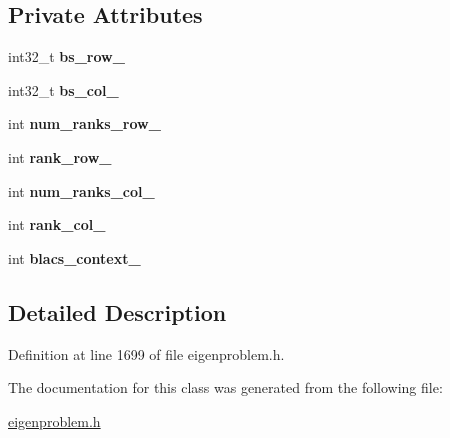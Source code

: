 \subsection*{Private Attributes}
\begin{DoxyCompactItemize}
\item 
\hypertarget{class_eigenproblem___r_s___g_p_u_a783aab3929071efb4bad3454c0ad5494}{}int32\+\_\+t {\bfseries bs\+\_\+row\+\_\+}\label{class_eigenproblem___r_s___g_p_u_a783aab3929071efb4bad3454c0ad5494}

\item 
\hypertarget{class_eigenproblem___r_s___g_p_u_ab6314ade9e64b03f6e8ec2c39efb1a95}{}int32\+\_\+t {\bfseries bs\+\_\+col\+\_\+}\label{class_eigenproblem___r_s___g_p_u_ab6314ade9e64b03f6e8ec2c39efb1a95}

\item 
\hypertarget{class_eigenproblem___r_s___g_p_u_a9fa24bba90538d81404297d6f36ff1b2}{}int {\bfseries num\+\_\+ranks\+\_\+row\+\_\+}\label{class_eigenproblem___r_s___g_p_u_a9fa24bba90538d81404297d6f36ff1b2}

\item 
\hypertarget{class_eigenproblem___r_s___g_p_u_a05352aa20d4d4a652f18402c0d038434}{}int {\bfseries rank\+\_\+row\+\_\+}\label{class_eigenproblem___r_s___g_p_u_a05352aa20d4d4a652f18402c0d038434}

\item 
\hypertarget{class_eigenproblem___r_s___g_p_u_aed85e1b79a44710b29b12664dd21bea2}{}int {\bfseries num\+\_\+ranks\+\_\+col\+\_\+}\label{class_eigenproblem___r_s___g_p_u_aed85e1b79a44710b29b12664dd21bea2}

\item 
\hypertarget{class_eigenproblem___r_s___g_p_u_a0ff7082f946e97aa6ed61a03cccdb040}{}int {\bfseries rank\+\_\+col\+\_\+}\label{class_eigenproblem___r_s___g_p_u_a0ff7082f946e97aa6ed61a03cccdb040}

\item 
\hypertarget{class_eigenproblem___r_s___g_p_u_a9a7929193156c739b15ab4a4fa8c8a05}{}int {\bfseries blacs\+\_\+context\+\_\+}\label{class_eigenproblem___r_s___g_p_u_a9a7929193156c739b15ab4a4fa8c8a05}

\end{DoxyCompactItemize}


\subsection{Detailed Description}


Definition at line 1699 of file eigenproblem.\+h.



The documentation for this class was generated from the following file\+:\begin{DoxyCompactItemize}
\item 
\hyperlink{eigenproblem_8h}{eigenproblem.\+h}\end{DoxyCompactItemize}
